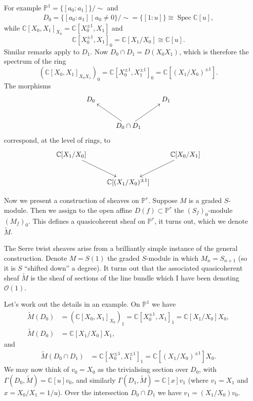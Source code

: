 \documentclass[12pt]{article}
\theoremstyle{plain}
\theoremstyle{definition}
\numberwithin{equation}{section}
\DeclareMathOperator{\spec}{Spec}
\newcommand{\C}{\mathbb{C}}
\newcommand{\bbP}{\mathbb{P}}
\newcommand{\OO}{\mathcal{O}}
\begin{document}
For example $\bbP^1 = \{[a_0 : a_1]\} / \sim$ and
\begin{align*}
D_0 = \{[a_0 : a_1] \mid a_0 \neq 0\} / \sim = \{[1 : u]\} \cong \spec \C[u],
\end{align*}
while $\C[X_0, X_1]_{X_0} = \C[X_0^{\pm 1}, X_1]$ and
\[
\C[X_0^{\pm 1}, X_1]_0 = \C[X_1 / X_0] \cong \C[u].
\]
Similar remarks apply to $D_1$. Now $D_0 \cap D_1 = D(X_0X_1)$, which is therefore the spectrum of the ring
\[
(\C[X_0, X_1]_{X_0X_1})_0 = \C[X_0^{\pm 1}, X_1^{\pm 1}]_0 = \C[(X_1 / X_0)^{\pm 1}].
\]
The morphisms
\begin{align*}
\xymatrix{
D_0 & & D_1 \\
%
& D_0 \cap D_1 \ar@{->}[ul] \ar@{->}[ur] & \\
}
\end{align*}
correspond, at the level of rings, to
\begin{align*}
\xymatrix{
\C[X_1 / X_0] \ar@{->}[dr] & & \C[X_0 / X_1] \ar@{->}[dl] \\
%
& \C[(X_1 / X_0)^{\pm 1}] & \\
}
\end{align*}

Now we present a construction of sheaves on $\bbP^r$. Suppose $M$ is a graded $S$-module. Then we assign to the open affine $D(f) \subset \bbP^r$ the $(S_f)_0$-module $(M_f)_0$. This defines a quasicoherent sheaf on $\bbP^r$, it turns out, which we denote $\widetilde{M}$.

The Serre twist sheaves arise from a brilliantly simple instance of the general construction. Denote $M = S(1)$ the graded $S$-module in which $M_n = S_{n+1}$ (so it is $S$ ``shifted down'' a degree). It turns out that the associated quasicoherent sheaf $\widetilde M$ is the sheaf of sections of the line bundle which I have been denoting $\OO(1)$.

Let's work out the details in an example. On $\bbP^1$ we have
\begin{align*}
\widetilde{M}(D_0) &= (\C[X_0, X_1]_{X_0})_1 = \C[X_0^{\pm 1}, X_1]_1 = \C[X_1 / X_0] X_0, \\
%
\widetilde{M}(D_0) &= \C[X_1 / X_0] X_1,
\end{align*}
and
\begin{align*}
\widetilde{M}(D_0 \cap D_1) &= \C[X_0^{\pm 1}, X_1^{\pm 1}]_1 = \C[(X_1 / X_0)^{\pm 1}] X_0.
\end{align*}
We may now think of $v_0 = X_0$ as the trivialising section over $D_0$, with $\Gamma(D_0, \widetilde{M}) = \C[u]v_0$, and similarly $\Gamma(D_1, \widetilde{M}) = \C[x] v_1$ (where $v_1 = X_1$ and $x = X_0 / X_1 = 1/u$). Over the intersection $D_0 \cap D_1$ we have $v_1 = (X_1 / X_0) v_0$.
\end{document}

